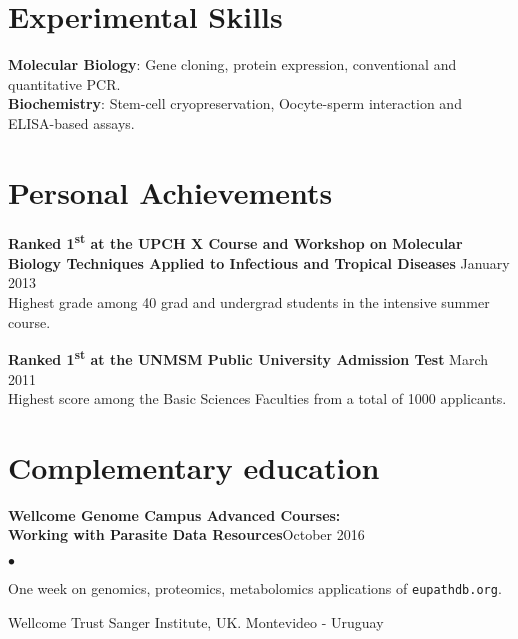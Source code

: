 \documentclass[margin,line]{res}
\newenvironment{list2}{
  \begin{list}{$\bullet$}{%
      \setlength{\itemsep}{0in}
      \setlength{\parsep}{0in} \setlength{\parskip}{0in}
      \setlength{\topsep}{0in} \setlength{\partopsep}{0in}
      \setlength{\leftmargin}{0.2in}}}{\end{list}}
\begin{document}
\begin{resume}
\section{\sc Experimental Skills}
{\bf Molecular Biology}: Gene cloning, protein expression, conventional and quantitative PCR.\\%
{\bf Biochemistry}: Stem-cell cryopreservation, Oocyte-sperm interaction and ELISA-based assays.\\ 

\newpage

\section{\sc Personal Achievements}

{\bf Ranked 1\textsuperscript{st} at the UPCH X Course and Workshop on Molecular\\Biology Techniques Applied to Infectious and Tropical Diseases} \hfill January 2013\\
Highest grade among 40 grad and undergrad students in the intensive summer course.

{\bf Ranked 1\textsuperscript{st} at the UNMSM Public University Admission Test} \hfill March 2011\\
Highest score among the Basic Sciences Faculties from a total of 1000 applicants.\\%

\section{\sc Complementary education}

{\bf Wellcome Genome Campus Advanced Courses:\\Working with Parasite Data Resources}\hfill {October 2016}\\
	\vspace*{-.1in}%
\begin{list2} %
	\item One week on genomics, proteomics, metabolomics applications of \texttt{eupathdb.org}.
	\item Wellcome Trust Sanger Institute, UK. Montevideo - Uruguay %
\end{list2}


\end{resume}
\end{document}
